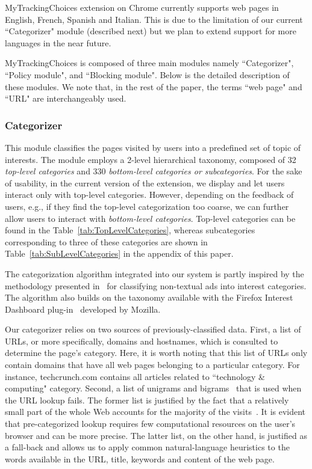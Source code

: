 \documentclass[conference]{IEEEtran}
\begin{document}
MyTrackingChoices extension on Chrome currently supports web pages in English, French, Spanish and Italian. 
This is due to the limitation of our current ``Categorizer" module (described next) but we plan to extend support for more languages in the near future.


MyTrackingChoices is composed of three main modules namely ``Categorizer", ``Policy module", and ``Blocking module".
Below is the detailed description of these modules. 
We note that, in the rest of the paper, the terms ``web page" and ``URL" are interchangeably used.






\subsubsection{Categorizer}
This module classifies the pages visited by users into a predefined set of topic of interests. 
The module employs a 2-level hierarchical taxonomy, composed of 32 \textit{top-level categories} and 330 \textit{bottom-level categories or subcategories}.
For the sake of usability, in the current version of the extension, we display and let users interact only with top-level categories.
However, depending on the feedback of users, e.g., if they find the top-level categorization too coarse, we can further allow users to interact with \textit{bottom-level categories}. 
Top-level categories can be found in the Table~\ref{tab:TopLevelCategories}, whereas subcategories corresponding to three of these categories are shown in Table~\ref{tab:SubLevelCategories} in the appendix of this paper. 


The categorization algorithm integrated into our system is partly inspired by the methodology presented in~\cite{Kae11LSDM} for classifying non-textual ads into interest categories. 
The algorithm also builds on the taxonomy available with the Firefox Interest Dashboard plug-in~\cite{FID14plugin} developed by Mozilla.

Our categorizer relies on two sources of previously-classified data. 
First, a list of URLs, or more specifically, domains and hostnames,
which is consulted to determine the page's category. 
Here, it is worth noting that this list of URLs only contain domains that have all web pages belonging to a particular category.
For instance, techcrunch.com contains all articles related to ``technology \& computing" category.
Second, a list of unigrams and bigrams~\cite{Manning99B} that is used when the URL lookup fails. 
The former list is justified by the fact that a relatively small part of the whole Web accounts for the majority of the visits~\cite{amrit_gsb_privacy}. 
It is evident that pre-categorized lookup requires few computational resources on the user's browser and can be more precise. 
The latter list, on the other hand, is justified as a fall-back and allows us to apply common natural-language heuristics to the words available in the URL, title, keywords and content of the web page.
\end{document}
